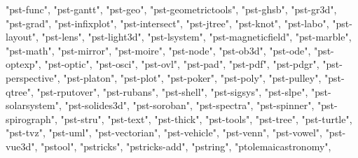 \documentclass[
]{article}
\newenvironment{Shaded}{\begin{snugshade}}{\end{snugshade}}
\newcommand{\NormalTok}[1]{#1}
\newcommand{\StringTok}[1]{\textcolor[rgb]{0.31,0.60,0.02}{#1}}
\begin{document}
\begin{Shaded}
\begin{Highlighting}[]
\StringTok{"pst{-}func"}\NormalTok{, }\StringTok{"pst{-}gantt"}\NormalTok{, }\StringTok{"pst{-}geo"}\NormalTok{, }\StringTok{"pst{-}geometrictools"}\NormalTok{, }\StringTok{"pst{-}ghsb"}\NormalTok{, }
\StringTok{"pst{-}gr3d"}\NormalTok{, }\StringTok{"pst{-}grad"}\NormalTok{, }\StringTok{"pst{-}infixplot"}\NormalTok{, }\StringTok{"pst{-}intersect"}\NormalTok{, }\StringTok{"pst{-}jtree"}\NormalTok{, }
\StringTok{"pst{-}knot"}\NormalTok{, }\StringTok{"pst{-}labo"}\NormalTok{, }\StringTok{"pst{-}layout"}\NormalTok{, }\StringTok{"pst{-}lens"}\NormalTok{, }\StringTok{"pst{-}light3d"}\NormalTok{, }
\StringTok{"pst{-}lsystem"}\NormalTok{, }\StringTok{"pst{-}magneticfield"}\NormalTok{, }\StringTok{"pst{-}marble"}\NormalTok{, }\StringTok{"pst{-}math"}\NormalTok{, }
\StringTok{"pst{-}mirror"}\NormalTok{, }\StringTok{"pst{-}moire"}\NormalTok{, }\StringTok{"pst{-}node"}\NormalTok{, }\StringTok{"pst{-}ob3d"}\NormalTok{, }\StringTok{"pst{-}ode"}\NormalTok{, }
\StringTok{"pst{-}optexp"}\NormalTok{, }\StringTok{"pst{-}optic"}\NormalTok{, }\StringTok{"pst{-}osci"}\NormalTok{, }\StringTok{"pst{-}ovl"}\NormalTok{, }\StringTok{"pst{-}pad"}\NormalTok{, }
\StringTok{"pst{-}pdf"}\NormalTok{, }\StringTok{"pst{-}pdgr"}\NormalTok{, }\StringTok{"pst{-}perspective"}\NormalTok{, }\StringTok{"pst{-}platon"}\NormalTok{, }\StringTok{"pst{-}plot"}\NormalTok{, }
\StringTok{"pst{-}poker"}\NormalTok{, }\StringTok{"pst{-}poly"}\NormalTok{, }\StringTok{"pst{-}pulley"}\NormalTok{, }\StringTok{"pst{-}qtree"}\NormalTok{, }\StringTok{"pst{-}rputover"}\NormalTok{, }
\StringTok{"pst{-}rubans"}\NormalTok{, }\StringTok{"pst{-}shell"}\NormalTok{, }\StringTok{"pst{-}sigsys"}\NormalTok{, }\StringTok{"pst{-}slpe"}\NormalTok{, }\StringTok{"pst{-}solarsystem"}\NormalTok{, }
\StringTok{"pst{-}solides3d"}\NormalTok{, }\StringTok{"pst{-}soroban"}\NormalTok{, }\StringTok{"pst{-}spectra"}\NormalTok{, }\StringTok{"pst{-}spinner"}\NormalTok{, }
\StringTok{"pst{-}spirograph"}\NormalTok{, }\StringTok{"pst{-}stru"}\NormalTok{, }\StringTok{"pst{-}text"}\NormalTok{, }\StringTok{"pst{-}thick"}\NormalTok{, }\StringTok{"pst{-}tools"}\NormalTok{, }
\StringTok{"pst{-}tree"}\NormalTok{, }\StringTok{"pst{-}turtle"}\NormalTok{, }\StringTok{"pst{-}tvz"}\NormalTok{, }\StringTok{"pst{-}uml"}\NormalTok{, }\StringTok{"pst{-}vectorian"}\NormalTok{, }
\StringTok{"pst{-}vehicle"}\NormalTok{, }\StringTok{"pst{-}venn"}\NormalTok{, }\StringTok{"pst{-}vowel"}\NormalTok{, }\StringTok{"pst{-}vue3d"}\NormalTok{, }\StringTok{"pstool"}\NormalTok{, }
\StringTok{"pstricks"}\NormalTok{, }\StringTok{"pstricks{-}add"}\NormalTok{, }\StringTok{"pstring"}\NormalTok{, }\StringTok{"ptolemaicastronomy"}\NormalTok{, }

\end{Highlighting}
\end{Shaded}
\end{document}

